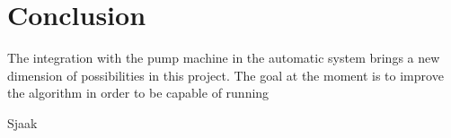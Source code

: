 \section{Conclusion}

The integration with the pump machine in the automatic system brings a new dimension of possibilities in this project.
The goal at the moment is to improve the algorithm in order to be capable of running 

Sjaak\cite*[]{Sjaaks} 
